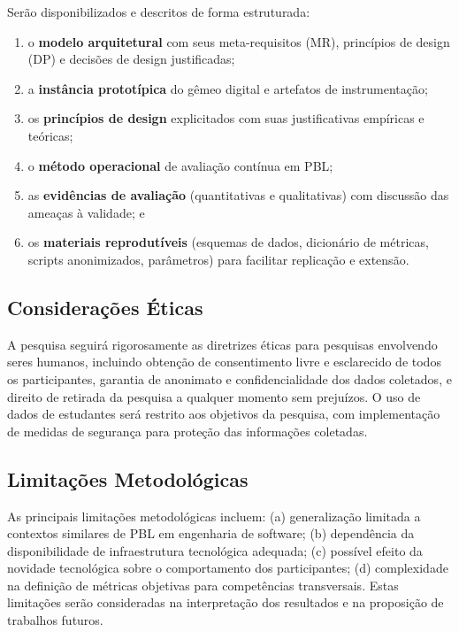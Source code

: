 \documentclass[12pt,a4paper]{article}
\begin{document}
Serão disponibilizados e descritos de forma estruturada:
\begin{enumerate}
  \item o \textbf{modelo arquitetural} com seus meta-requisitos (MR), princípios de design (DP) e decisões de design justificadas;
  \item a \textbf{instância prototípica} do gêmeo digital e artefatos de instrumentação;
  \item os \textbf{princípios de design} explicitados com suas justificativas empíricas e teóricas;
  \item o \textbf{método operacional} de avaliação contínua em PBL;
  \item as \textbf{evidências de avaliação} (quantitativas e qualitativas) com discussão das ameaças à validade; e
  \item os \textbf{materiais reprodutíveis} (esquemas de dados, dicionário de métricas, scripts anonimizados, parâmetros) para facilitar replicação e extensão.
\end{enumerate}

\subsection{Considerações Éticas}

A pesquisa seguirá rigorosamente as diretrizes éticas para pesquisas envolvendo
seres humanos, incluindo obtenção de consentimento livre e esclarecido de todos
os participantes, garantia de anonimato e confidencialidade dos dados
coletados, e direito de retirada da pesquisa a qualquer momento sem prejuízos.
O uso de dados de estudantes será restrito aos objetivos da pesquisa, com
implementação de medidas de segurança para proteção das informações coletadas.

\subsection{Limitações Metodológicas}

As principais limitações metodológicas incluem: (a) generalização limitada a
contextos similares de PBL em engenharia de software; (b) dependência da
disponibilidade de infraestrutura tecnológica adequada; (c) possível efeito da
novidade tecnológica sobre o comportamento dos participantes; (d) complexidade
na definição de métricas objetivas para competências transversais. Estas
limitações serão consideradas na interpretação dos resultados e na proposição
de trabalhos futuros.
\end{document}
